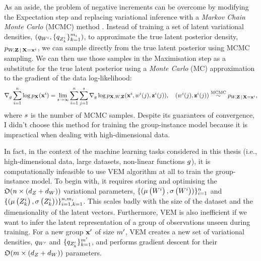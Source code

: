 \documentclass[../thesis.tex]{subfiles}
\begin{document}
As an aside, the problem of negative increments can be overcome by modifying the Expectation step and replacing variational inference with a \textit{Markov Chain Monte Carlo} (MCMC) method \citep{andrieuIntroductionMCMCMachine2003}. Instead of training a set of latent variational densities, $(\myfunc{q}_{\myrv{w}^i}, \{\myfunc{q}_{\myrv{z}^i_k}\}_{k=1}^{\mycnt{m}_i})$, to approximate the true latent posterior density, $\myfunc{p}_{\myrv{w}, \mygroup{\myrv{z}} \,|\, \mygroup{\myrv{x}} = \mygroup{\myvect{x}}^i}$, we can sample directly from the true latent posterior using MCMC sampling. We can then use those samples in the Maximisation step as a substitute for the true latent posterior using a \textit{Monte Carlo} (MC) approximation to the gradient of the data log-likelihood:
\[
    \nabla_{\myfunc{g}} \sum_{i=1}^\mycnt{n} \log \myfunc{p}_{\mygroup{\myrv{x}}} (\mygroup{\myvect{x}}^i) = \lim_{\mycnt{s} \to \infty} \sum_{i=1}^{\mycnt{n}} \sum_{j=1}^{\mycnt{s}} \nabla_{\myfunc{g}} \log \myfunc{p}_{\mygroup{\myrv{x}}, \myrv{w}, \mygroup{\myrv{z}}} (\mygroup{\myvect{x}}^i, \myvect{w}^i (j), \mygroup{\myvect{z}}^i (j)), \quad (\myvect{w}^i (j), \mygroup{\myvect{z}}^i (j)) \overset{\text{MCMC}}{\sim} \myfunc{p}_{\myrv{w}, \mygroup{\myrv{z}} \,|\, \mygroup{\myrv{x}} = \mygroup{\myvect{x}}^i},
\]
where $s$ is the number of MCMC samples.  Despite its guarantees of convergence, I didn't choose this method for training the group-instance model because it is impractical when dealing with high-dimensional data.

In fact, in the context of the machine learning tasks considered in this thesis (i.e., high-dimensional data, large datasets, non-linear functions $g$), it is computationally infeasible to use VEM algorithm at all to train the group-instance model. To begin with, it requires storing and optimising the $\mathfrak{O}(\mycnt{n} \times (\mydim{z} + \mydim{w}))$ variational parameters, $\{(\myvect{\mu} \left( \myrv{w}^i \right), \myvect{\sigma} \left( \myrv{w}^i \right))\}_{i=1}^\mycnt{n}$ and $\{(\myvect{\mu} \left( \myrv{z}^i_k \right), \myvect{\sigma} \left( \myrv{z}^i_k \right))\}_{i=1, k=1}^{\mycnt{n}, \mycnt{m}_i}$. This scales badly with the size of the dataset and the dimensionality of the latent vectors. Furthermore, VEM is also inefficient if we want to infer the latent representation of a group of observations unseen during training. For a new group $\mathbf{{x}}'$ of size $m'$, VEM creates a new set of variational densities, $\myfunc{q}_{\myrv{w}'}$ and $\{\myfunc{q}_{\myrv{z}'_{k}}\}_{k=1}^{\mycnt{m}'}$, and performs gradient descent for their $\mathfrak{O} (\mycnt{m} \times (\mydim{z} + \mydim{w}))$ parameters.
\end{document}
